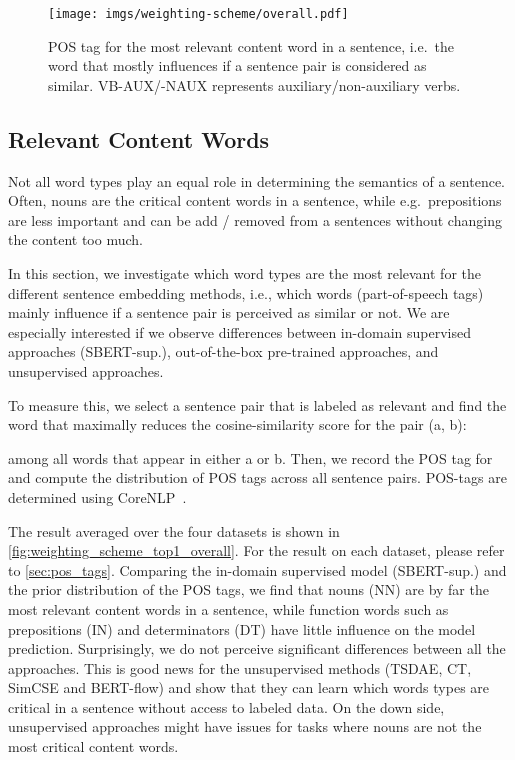 \documentclass[11pt]{article}
\begin{document}
\begin{figure}[t]
  \centering
  \texttt{[image: imgs/weighting-scheme/overall.pdf]}
  \caption{POS tag for the most relevant content word in a sentence, i.e.\ the word that mostly influences if a sentence pair is considered as similar. VB-AUX/-NAUX represents auxiliary/non-auxiliary verbs.}
  \label{fig:weighting_scheme_top1_overall}
\end{figure}



\subsection{Relevant Content Words}

Not all word types play an equal role in determining the semantics of a sentence. Often, nouns are the critical content words in a sentence, while e.g.\ prepositions are less important and can be add / removed from a sentences without changing the content too much.

In this section, we investigate which word types are the most relevant for the different sentence embedding methods, i.e., which words (part-of-speech tags) mainly influence if a sentence pair is perceived as similar or not. We are especially interested if we observe differences between in-domain supervised approaches (SBERT-sup.), out-of-the-box pre-trained approaches, and unsupervised approaches.  

To measure this, we select a sentence pair  that is labeled as relevant and find the word that maximally reduces the cosine-similarity score for the pair (a, b):

among all words  that appear in either a or b. Then, we record the POS tag for  and compute the distribution of POS tags across all sentence pairs. POS-tags are determined using CoreNLP~\citep{manning-etal-2014-stanford}.

The result averaged over the four datasets is shown in \autoref{fig:weighting_scheme_top1_overall}. For the result on each dataset, please refer to \autoref{sec:pos_tags}. Comparing the in-domain supervised model (SBERT-sup.) and the prior distribution of the POS tags, we find that nouns (NN) are by far the most relevant content words in a sentence, while function words such as prepositions (IN) and determinators (DT) have little influence on the model prediction. Surprisingly, we do not perceive significant differences between all the approaches. This is good news for the unsupervised methods (TSDAE, CT, SimCSE and BERT-flow) and show that they can learn which words types are critical in a sentence without access to labeled data. On the down side, unsupervised approaches might have issues for tasks where nouns are not the most critical content words.
\end{document}
